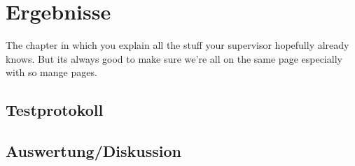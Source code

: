\documentclass[thesis.tex]{subfiles}
\begin{document}
\chapter{Ergebnisse}\label{chap:ergebnisse}
The chapter in which you explain all the stuff your supervisor hopefully already knows. But its always good to make sure we're all on the same page especially with so mange pages.

\section{Testprotokoll}
\section{Auswertung/Diskussion}

\subfilebib %
\end{document}
